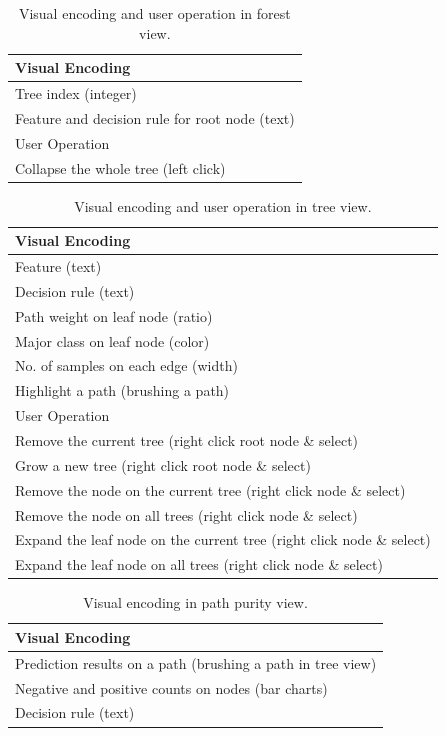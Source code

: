 \documentclass{chi2009}
\begin{document}
\begin{table}[ht]
\caption{Visual encoding and user operation in forest view.}
\begin{center}
\begin{tabular}{|l|}
\hline
Visual Encoding\\
\hline
Tree index (integer)\\
Feature and decision rule for root node (text)\\
\hline
\hline 
User Operation\\
\hline
Collapse the whole tree (left click)\\
\hline
\end{tabular}
\end{center}
\end{table}

\begin{table}[ht]\small
\caption{Visual encoding and user operation in tree view.}
\begin{center}
\begin{tabular}{|l|}
\hline
Visual Encoding\\
\hline
Feature (text)\\
Decision rule (text)\\
Path weight on leaf node (ratio)\\
Major class on leaf node (color)\\
No. of samples on each edge (width)\\
Highlight a path (brushing a path)\\
\hline
\hline 
User Operation\\
\hline
Remove the current tree (right click root node \& select)\\
Grow a new tree (right click root node \& select)\\
Remove the node on the current tree (right click node \& select)\\
Remove the node on all trees (right click node \& select)\\
Expand the leaf node on the current tree (right click node \& select)\\
Expand the leaf node on all trees (right click node \& select)\\
\hline
\end{tabular}
\end{center}
\end{table}
\normalsize

\begin{table}[ht]
\caption{Visual encoding in path purity view.}
\begin{center}
\begin{tabular}{|l|}
\hline
Visual Encoding\\
\hline
Prediction results on a path (brushing a path in tree view)\\
Negative and positive counts on nodes (bar charts)\\
Decision rule (text)\\
\hline
\end{tabular}
\end{center}
\end{table}
\end{document}
